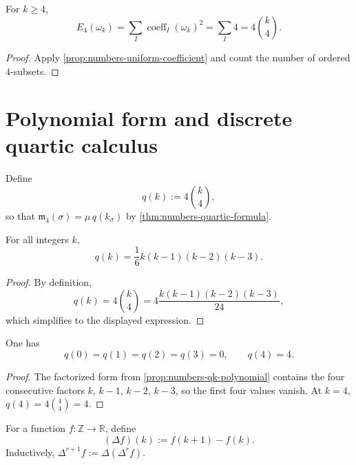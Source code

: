 \begin{corollary}
\label{cor:numbers-energy-by-counting}
For \(k\ge4\),
\[
  E_4(\omega_k)
  =
  \sum_I \operatorname{coeff}_I(\omega_k)^2
  =
  \sum_I 4
  =
  4\binom{k}{4}.
\]
\end{corollary}

\begin{proof}
Apply \cref{prop:numbers-uniform-coefficient} and count the number of
ordered \(4\)-subsets.
\end{proof}

\section{Polynomial form and discrete quartic calculus}
\label{sec:numbers-discrete-calculus}

\begin{definition}
\label{def:numbers-qk}
Define
\[
  q(k):=4\binom{k}{4},
\]
so that
\(
  \mathfrak m_4(\sigma)=\mu\,q(k_\sigma)
\)
by \cref{thm:numbers-quartic-formula}.
\end{definition}

\begin{proposition}
\label{prop:numbers-qk-polynomial}
For all integers \(k\),
\[
  q(k)=\frac{1}{6}k(k-1)(k-2)(k-3).
\]
\end{proposition}

\begin{proof}
By definition,
\[
  q(k)=4\binom{k}{4}=4\frac{k(k-1)(k-2)(k-3)}{24},
\]
which simplifies to the displayed expression.
\end{proof}

\begin{lemma}
\label{lem:numbers-qk-vanishing}
One has
\[
  q(0)=q(1)=q(2)=q(3)=0,
  \qquad
  q(4)=4.
\]
\end{lemma}

\begin{proof}
The factorized form from \cref{prop:numbers-qk-polynomial} contains the
four consecutive factors
\(k\), \(k-1\), \(k-2\), \(k-3\), so the first four values vanish.
At \(k=4\),
\(
  q(4)=4\binom{4}{4}=4
\).
\end{proof}

\begin{definition}
\label{def:numbers-forward-diff}
For a function \(f:\mathbb Z\to\mathbb R\), define
\[
  (\Delta f)(k):=f(k+1)-f(k).
\]
Inductively,
\(
  \Delta^{r+1}f:=\Delta(\Delta^r f)
\).
\end{definition}

